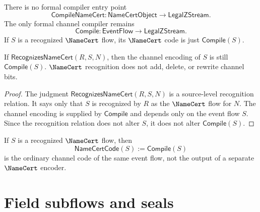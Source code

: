 \begin{principle}
\label{prin:namecert-generated-no-external-namecert-input}
There is no formal compiler entry point
$$
  \mathsf{CompileNameCert} \colon \mathsf{NameCertObject}
  \longrightarrow \mathsf{LegalZStream}.
$$
The only formal channel compiler remains
$$
  \mathsf{Compile} \colon \mathsf{EventFlow}
  \longrightarrow \mathsf{LegalZStream}.
$$
If $S$ is a recognized $\NameCert$ flow, its $\NameCert$ code is just $\mathsf{Compile}(S)$.
\end{principle}

\begin{proposition}
\label{prop:namecert-generated-recognition-preserves-code}
If $\mathsf{RecognizesNameCert}(R,S,N)$, then the channel encoding of $S$ is still $\mathsf{Compile}(S)$. $\NameCert$ recognition does not add, delete, or rewrite channel bits.
\end{proposition}

\begin{proof}
The judgment $\mathsf{RecognizesNameCert}(R,S,N)$ is a source-level recognition relation. It says only that $S$ is recognized by $R$ as the $\NameCert$ flow for $N$. The channel encoding is supplied by $\mathsf{Compile}$ and depends only on the event flow $S$. Since the recognition relation does not alter $S$, it does not alter $\mathsf{Compile}(S)$.
\end{proof}

\begin{corollary}
\label{cor:namecert-generated-code-not-separate}
If $S$ is a recognized $\NameCert$ flow, then
$$
  \mathsf{NameCertCode}(S) := \mathsf{Compile}(S)
$$
is the ordinary channel code of the same event flow, not the output of a separate $\NameCert$ encoder.
\end{corollary}

\section{Field subflows and seals}
\label{sec:namecert-generated-fields-and-seals}

